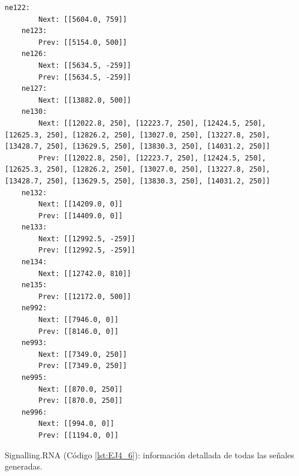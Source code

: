 \begin{lstlisting}[language = {}, tabsize=4, basicstyle=\footnotesize\ttfamily, showspaces=false, showstringspaces=false, caption = SafePoints.RNA, label = {lst:EJ4_5}]
	ne122:
		Next: [[5604.0, 759]]
	ne123:
		Prev: [[5154.0, 500]]
	ne126:
		Next: [[5634.5, -259]]
		Prev: [[5634.5, -259]]
	ne127:
		Next: [[13882.0, 500]]
	ne130:
		Next: [[12022.8, 250], [12223.7, 250], [12424.5, 250], [12625.3, 250], [12826.2, 250], [13027.0, 250], [13227.8, 250], [13428.7, 250], [13629.5, 250], [13830.3, 250], [14031.2, 250]]
		Prev: [[12022.8, 250], [12223.7, 250], [12424.5, 250], [12625.3, 250], [12826.2, 250], [13027.0, 250], [13227.8, 250], [13428.7, 250], [13629.5, 250], [13830.3, 250], [14031.2, 250]]
	ne132:
		Next: [[14209.0, 0]]
		Prev: [[14409.0, 0]]
	ne133:
		Next: [[12992.5, -259]]
		Prev: [[12992.5, -259]]
	ne134:
		Next: [[12742.0, 810]]
	ne135:
		Prev: [[12172.0, 500]]
	ne992:
		Next: [[7946.0, 0]]
		Prev: [[8146.0, 0]]
	ne993:
		Next: [[7349.0, 250]]
		Prev: [[7349.0, 250]]
	ne995:
		Next: [[870.0, 250]]
		Prev: [[870.0, 250]]
	ne996:
		Next: [[994.0, 0]]
		Prev: [[1194.0, 0]]
\end{lstlisting}

Signalling.RNA (Código \ref{lst:EJ4_6}): información detallada de todas las señales generadas.


